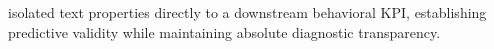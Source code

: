 isolated text properties directly to a downstream behavioral KPI, establishing predictive validity while maintaining absolute diagnostic transparency.

















